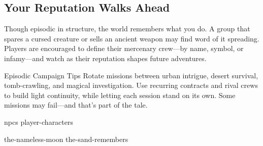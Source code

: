 \subsection*{Your Reputation Walks Ahead}

Though episodic in structure, the world remembers what you do. A group that spares a cursed creature or sells an ancient weapon may find word of it spreading. Players are encouraged to define their mercenary crew—by name, symbol, or infamy—and watch as their reputation shapes future adventures.

\begin{CommentBox}{Episodic Campaign Tips}
    Rotate missions between urban intrigue, desert survival, tomb-crawling, and magical investigation. Use recurring contracts and rival crews to build light continuity, while letting each session stand on its own. Some missions may fail—and that’s part of the tale.
\end{CommentBox}


{npcs}
{player-characters}


{the-nameless-moon}
{the-sand-remembers}


